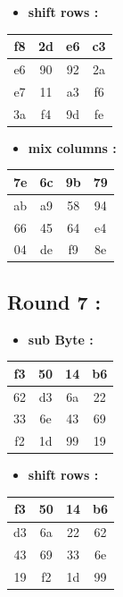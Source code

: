 \documentclass{article}
\begin{document}
\begin{itemize}
    \item \textbf{shift rows :}
\end{itemize} \begin{tabular}{|c|c|c|c|}
\hline f8 & 2d & e6 & c3 \\ \hline e6 & 90 & 92 & 2a \\ \hline e7 & 11 & a3 & f6 \\ \hline 3a & f4 & 9d & fe \\ \hline \end{tabular}\hspace{0.5cm}\vspace{0.1cm}\begin{itemize}
    \item \textbf{mix columns :}
\end{itemize} \begin{tabular}{|c|c|c|c|}
\hline 7e & 6c & 9b & 79 \\ \hline ab & a9 & 58 & 94 \\ \hline 66 & 45 & 64 & e4 \\ \hline 04 & de & f9 & 8e \\ \hline \end{tabular}\hspace{0.5cm}\vspace{0.1cm}\subsection*{Round 7 : }\begin{itemize}
    \item \textbf{sub Byte :}
\end{itemize} \begin{tabular}{|c|c|c|c|}
\hline f3 & 50 & 14 & b6 \\ \hline 62 & d3 & 6a & 22 \\ \hline 33 & 6e & 43 & 69 \\ \hline f2 & 1d & 99 & 19 \\ \hline \end{tabular}\hspace{0.5cm}\vspace{0.1cm}\begin{itemize}
    \item \textbf{shift rows :}
\end{itemize} \begin{tabular}{|c|c|c|c|}
\hline f3 & 50 & 14 & b6 \\ \hline d3 & 6a & 22 & 62 \\ \hline 43 & 69 & 33 & 6e \\ \hline 19 & f2 & 1d & 99 \\ \hline \end{tabular}\hspace{0.5cm}\vspace{0.1cm}\begin{itemize}

\end{itemize}
\end{document}
